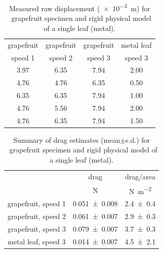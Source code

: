 \begin{table}
\caption{Measured raw displacement (\SI{e-3}{\meter}) for \Cxparadisi\ grapefruit specimen and rigid physical model of a single leaf (metal).}
\label{tab:results:displacement}
\begin{center}
\begin{tabular}{cccc}
\toprule
grapefruit & grapefruit & grapefruit & metal leaf \\
speed 1 & speed 2 & speed 3 & speed 3 \\ 
\midrule
3.97 & 6.35 & 7.94 & 2.00 \\ %
4.76 & 4.76 & 6.35 & 0.50 \\
6.35 & 6.35 & 7.94 & 1.00 \\
4.76 & 5.56 & 7.94 & 2.00 \\
4.76 & 6.35 & 7.94 & 1.50 \\
\bottomrule
\end{tabular}
\end{center}
\end{table}

\begin{table}
\caption{Summary of drag estimates (mean$\pm$s.d.) for \Cxparadisi\ grapefruit specimen and rigid physical model of a single leaf (metal).}
\label{tab:results:drag}
\begin{center}
\begin{tabular}{lcc} %
\toprule
& drag & drag/area \\
& \si{\newton} & \si{\newton\per\meter\squared} \\
\midrule
grapefruit, speed 1 & \num{0.051\pm0.008} & \num{2.4\pm0.4} \\
grapefruit, speed 2 & \num{0.061\pm0.007} & \num{2.9\pm0.3} \\
grapefruit, speed 3 & \num{0.079\pm0.007} & \num{3.7\pm0.3} \\
metal leaf, speed 3 & \num{0.014\pm0.007} & \num{4.5\pm2.1} \\
\bottomrule
\end{tabular}
\end{center}
\end{table}

